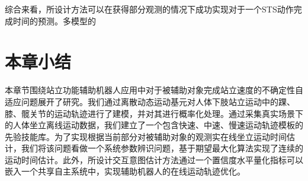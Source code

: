 综合来看，所设计方法可以在获得部分观测的情况下成功实现对于一个STS动作完成时间的预测。多模型的

\section{本章小结}
本章节围绕站立功能辅助机器人应用中对于被辅助对象完成站立速度的不确定性自适应问题展开了研究。我们通过离散动态运动基元对人体下肢站立运动中的踝、膝、髋关节的运动轨迹进行了建模，并对其进行概率化处理。通过采集真实场景下的人体坐立离线运动数据，我们建立了一个包含快速、中速、慢速运动轨迹模板的先验技能库。为了实现根据当前部分对被辅助对象的观测实在线坐立运动时间估计，我们将该问题看做一个系统参数辨识问题，基于期望最大化算法实现了连续的运动时间估计。此外，所设计交互意图估计方法通过一个置信度水平量化指标可以嵌入一个共享自主系统中，实现辅助机器人的在线运动轨迹优化。
